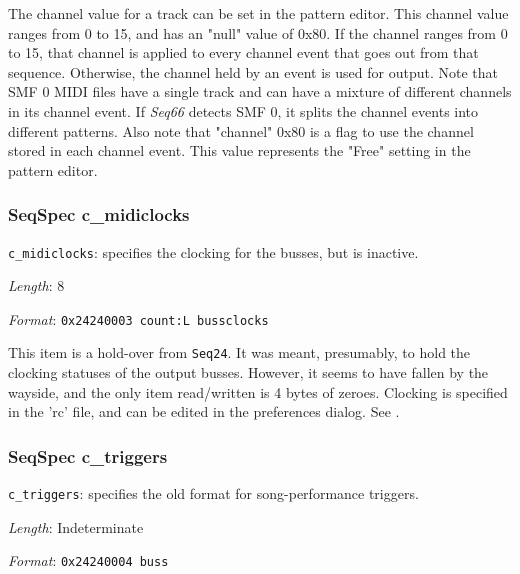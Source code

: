    The channel value for a track can be set in the pattern editor.
   This channel value ranges from 0 to 15, and has an "null" value of 0x80.  If
   the channel ranges from 0 to 15, that channel is applied to every channel
   event that goes out from that sequence.  Otherwise, the channel held by an
   event is used for output.  Note that SMF 0 MIDI files have a single track
   and can have a mixture of different channels in its channel event.
   If \textsl{Seq66} detects SMF 0, it splits the channel events into different
   patterns.
   Also note that "channel" 0x80 is a flag to use the channel stored in each
   channel event.
   This value represents the "Free" setting in the pattern editor.

\subsubsection{SeqSpec c\_midiclocks}
\label{subsubsec:midi_format_track_seqspec_midiclocks}


   \begin{description}
      \item \texttt{c\_midiclocks}: specifies the clocking for the busses,
         but is inactive.
      \item \textsl{Length}: 8
      \item \textsl{Format}: \texttt{0x24240003 count:L bussclocks}
   \end{description}

   This item is a hold-over from \texttt{Seq24}.  It was meant, presumably, to
   hold the clocking statuses of the output busses.  However, it seems to have
   fallen by the wayside, and the only item read/written is 4 bytes of zeroes.
   Clocking is specified in the 'rc' file, and can be edited in the preferences
   dialog.
   See .

\subsubsection{SeqSpec c\_triggers}
\label{subsubsec:midi_format_track_seqspec_triggers}


   \begin{description}
      \item \texttt{c\_triggers}:
         specifies the old format for song-performance triggers.
      \item \textsl{Length}: Indeterminate
      \item \textsl{Format}: \texttt{0x24240004 buss}
   \end{description}


